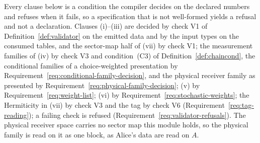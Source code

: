 
Every clause below is a condition the compiler decides on the declared
numbers and refuses when it fails, so a specification that is not well-formed
yields a refusal and not a declaration. Clauses (i)--(iii) are decided by
check V1 of Definition~\ref{def:validator} on the emitted data and by the
input types on the consumed tables, and the sector-map half of (vii) by check
V1; the
measurement families of (iv) by check V3 and condition~(C3) of
Definition~\ref{def:chaincond}, the conditional families of a
choice-weighted presentation by Requirement~\ref{req:conditional-family-decision},
and the physical receiver family as presented by
Requirement~\ref{req:physical-family-decision};
(v) by Requirement~\ref{req:weight-list}; (vi) by
Requirement~\ref{req:stochastic-weights}; the Hermiticity in (vii) by check
V3 and the tag by check V6 (Requirement~\ref{req:tag-reading}); a failing
check is refused (Requirement~\ref{req:validator-refusals}). The physical
receiver space carries no sector map this module holds, so the physical
family is read on it as one block, as Alice's data are read on $A$.

